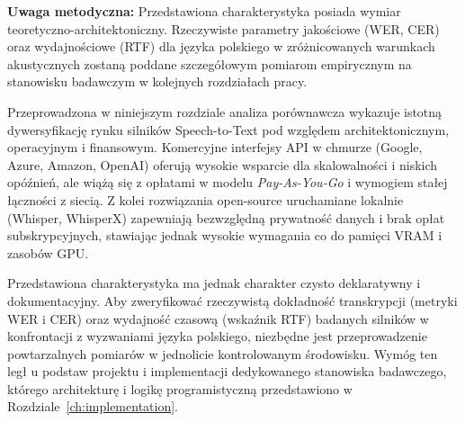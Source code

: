 \vspace{0.2cm}
\noindent\textbf{Uwaga metodyczna:}
Przedstawiona charakterystyka posiada wymiar teoretyczno-architektoniczny. Rzeczywiste parametry jakościowe (WER, CER) oraz wydajnościowe (RTF) dla języka polskiego w zróżnicowanych warunkach akustycznych zostaną poddane szczegółowym pomiarom empirycznym na stanowisku badawczym w kolejnych rozdziałach pracy.

\bigskip
Przeprowadzona w niniejszym rozdziale analiza porównawcza wykazuje istotną dywersyfikację rynku silników Speech-to-Text pod względem architektonicznym, operacyjnym i finansowym. Komercyjne interfejsy API w chmurze (Google, Azure, Amazon, OpenAI) oferują wysokie wsparcie dla skalowalności i niskich opóźnień, ale wiążą się z opłatami w modelu \textit{Pay-As-You-Go} i wymogiem stałej łączności z siecią. Z kolei rozwiązania open-source uruchamiane lokalnie (Whisper, WhisperX) zapewniają bezwzględną prywatność danych i brak opłat subskrypcyjnych, stawiając jednak wysokie wymagania co do pamięci VRAM i zasobów GPU.

Przedstawiona charakterystyka ma jednak charakter czysto deklaratywny i dokumentacyjny. Aby zweryfikować rzeczywistą dokładność transkrypcji (metryki WER i CER) oraz wydajność czasową (wskaźnik RTF) badanych silników w konfrontacji z wyzwaniami języka polskiego, niezbędne jest przeprowadzenie powtarzalnych pomiarów w jednolicie kontrolowanym środowisku. Wymóg ten legł u podstaw projektu i implementacji dedykowanego stanowiska badawczego, którego architekturę i logikę programistyczną przedstawiono w Rozdziale~\ref{ch:implementation}.
